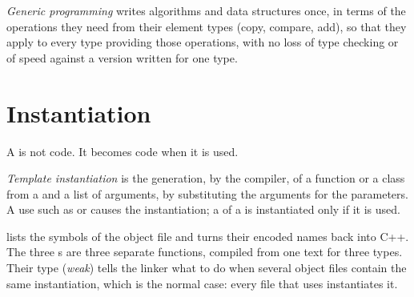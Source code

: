\label{lst:b2:cpp-templates:vec-demo}

\label{out:b2:cpp-templates:vec-demo}

\begin{definition}\label{def:b2:cpp-templates:generic}
\emph{Generic programming} writes algorithms and data structures once, in terms of the
operations they need from their element types (copy, compare, add), so that they apply to every type providing
those operations, with no loss of type checking or of speed against a version written for one type.
\end{definition}

\section{Instantiation}\label{sec:b2:cpp-templates:instantiation}

A  is not code. It becomes code when it is used.

\begin{definition}\label{def:b2:cpp-templates:instantiation}
\emph{Template instantiation} is the generation, by the compiler, of a function or a
class from a  and a list of  arguments, by substituting the arguments for the parameters. A use
such as  or  causes the instantiation; a  of a  is
instantiated only if it is used.
\end{definition}

\label{lst:b2:cpp-templates:instantiate}

\label{out:b2:cpp-templates:instantiate}

 lists the symbols of the object file and  turns their encoded names back into C++. The three
s are three separate functions, compiled from one text for three types. Their type 
(\emph{weak}) tells the linker what to do when several object files contain the same instantiation, which is the
normal case: every file that uses  instantiates it.


